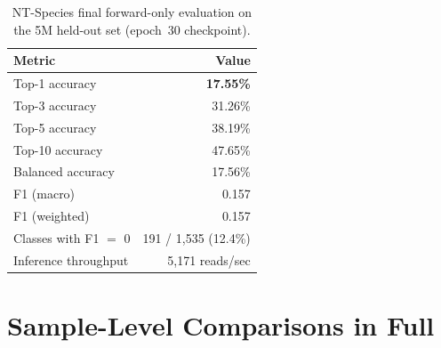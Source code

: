 \begin{table}[htbp]
    \centering
    \caption{NT-Species final forward-only evaluation on the 5M held-out set (epoch~30 checkpoint).}
    \label{tab:spv4-final-metrics}
    \begin{tabular}{lr}
        \toprule
        \textbf{Metric} & \textbf{Value} \\
        \midrule
        Top-1 accuracy              & \textbf{17.55\%} \\
        Top-3 accuracy              & 31.26\% \\
        Top-5 accuracy              & 38.19\% \\
        Top-10 accuracy             & 47.65\% \\
        Balanced accuracy           & 17.56\% \\
        F1 (macro)                  & 0.157 \\
        F1 (weighted)               & 0.157 \\
        Classes with F1 $=$ 0       & 191 / 1,535 (12.4\%) \\
        Inference throughput        & 5{,}171 reads/sec \\
        \bottomrule
    \end{tabular}
\end{table}

\section{Sample-Level Comparisons in Full}
\label{app:sample-tables}

